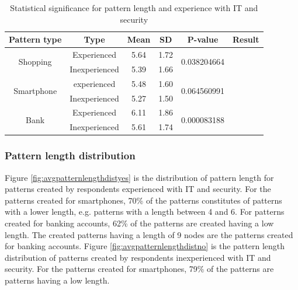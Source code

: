     \begin{table}[H]
      \centering
      \begin{tabular}{ c | c | c | c | c | c }
      \hline
        {\bf Pattern type} & {\bf Type} & {\bf Mean} & {\bf SD} & {\bf P-value} & {\bf Result} \\ \hline
        \multirow{2}{*}{Shopping}   & Experienced   & 5.64 & 1.72 & \multirow{2}{*}{0.038204664} & \multirow{2}{*}{\bf \color{red}{Not significant}} \\
                                    & Inexperienced & 5.39 & 1.66 & & \\ \hline
        \multirow{2}{*}{Smartphone} & experienced   & 5.48 & 1.60 & \multirow{2}{*}{0.064560991} & \multirow{2}{*}{\bf \color{red}{Not significant}} \\
                                    & Inexperienced & 5.27 & 1.50 & & \\ \hline
        \multirow{2}{*}{Bank}       & Experienced   & 6.11 & 1.86 & \multirow{2}{*}{0.000083188} & \multirow{2}{*}{\bf \color{olive}{Significant}} \\
                                    & Inexperienced & 5.61 & 1.74 & & \\ \hline
      \end{tabular}
      \caption{Statistical significance for pattern length and experience with IT and security}
      \label{tab:statsigLengthExperience}
    \end{table}

    \subsubsection{Pattern length distribution}
    Figure \ref{fig:avgpatternlengthdistyes} is the distribution of pattern length for patterns created by respondents experienced with IT and security. For the patterns created for smartphones, 70\% of the patterns constitutes of patterns with a lower length, e.g. patterns with a length between 4 and 6. For patterns created for banking accounts, 62\% of the patterns are created having a low length. The created patterns having a length of 9 nodes are the patterns created for banking accounts. Figure \ref{fig:avgpatternlengthdistno} is the pattern length distribution of patterns created by respondents inexperienced with IT and security. For the patterns created for smartphones, 79\% of the patterns are patterns having a low length.

